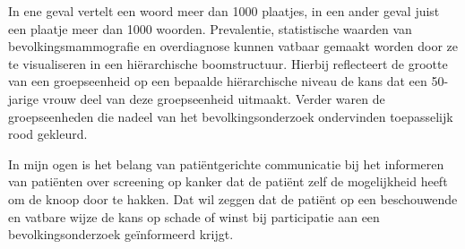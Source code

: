 \documentclass{scrartcl}
\begin{document}
In ene geval vertelt een woord meer dan 1000 plaatjes, in een ander geval juist een plaatje meer dan 1000 woorden. Prevalentie, statistische waarden van bevolkingsmammografie en overdiagnose kunnen vatbaar gemaakt worden door ze te visualiseren in een hi\"erarchische boomstructuur. Hierbij reflecteert de grootte van een groepseenheid op een bepaalde hi\"erarchische niveau de kans dat een 50-jarige vrouw deel van deze groepseenheid uitmaakt. Verder waren de groepseenheden die nadeel van het bevolkingsonderzoek ondervinden toepasselijk rood gekleurd.

In mijn ogen is het belang van pati\"entgerichte communicatie bij het informeren van patiënten over screening op kanker dat de pati\"ent zelf de mogelijkheid heeft om de knoop door te hakken. Dat wil zeggen dat de pati\"ent op een beschouwende en vatbare wijze de kans op schade of winst bij participatie aan een bevolkingsonderzoek ge\"{i}nformeerd krijgt.
\printbibliography
\end{document}
